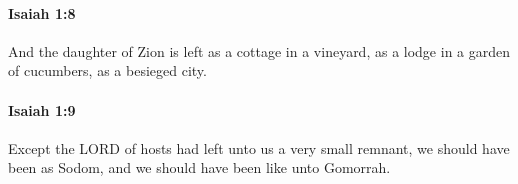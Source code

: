 		\paragraph{Isaiah 1:8} %
			\label{ISAIAH-1-8}

			And the daughter of Zion is left as a cottage in a vineyard, as a lodge in a garden of cucumbers, as a besieged city.


		\paragraph{Isaiah 1:9} %
			\label{ISAIAH-1-9}

			Except the LORD of hosts had left unto us a very small remnant, we should have been as Sodom, and we should have been like unto Gomorrah.


